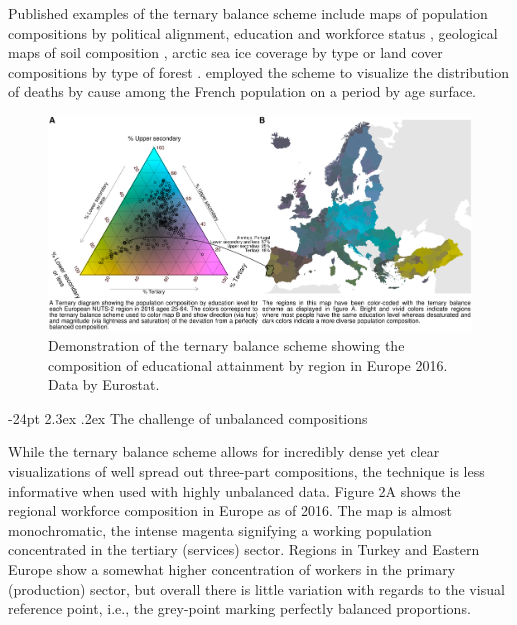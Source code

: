 \documentclass[10pt, twoside, parskip=half]{article}
\makeatletter
\def\maxwidth{\ifdim\Gin@nat@width>\linewidth\linewidth
\else\Gin@nat@width\fi}
\let\Oldincludegraphics\includegraphics
\renewcommand{\includegraphics}[1]{\Oldincludegraphics[width=\maxwidth]{#1}}
\renewcommand\section{\@startsection {section}{1}{\z@}%
                                   {-24pt}%
                                   {2.3ex \@plus.2ex}%
                                   {\normalfont\large\bfseries}}
\makeatother
\begin{document}
Published examples of the ternary balance scheme include maps of
population compositions by political alignment, education and workforce
status \citep{Dorling2012, Graetz2019, Brewer1994}, geological maps of
soil composition \citep{Metternicht2003}, arctic sea ice coverage by
type \citep{Denil2015} or land cover compositions by type of forest
\citep{Pirzamanbein2020, Steidinger2019}. \citet{Schoeley2017} employed
the scheme to visualize the distribution of deaths by cause among the
French population on a period by age surface.

\begin{figure}
\centering
\includegraphics{figure1.png}
\caption{Demonstration of the ternary balance scheme showing the
composition of educational attainment by region in Europe 2016. Data by
Eurostat.}
\end{figure}

\hypertarget{the-challenge-of-unbalanced-compositions}{%
\section{The challenge of unbalanced
compositions}\label{the-challenge-of-unbalanced-compositions}}

While the ternary balance scheme allows for incredibly dense yet clear
visualizations of well spread out three-part compositions, the technique
is less informative when used with highly unbalanced data. Figure 2A
shows the regional workforce composition in Europe as of 2016. The map
is almost monochromatic, the intense magenta signifying a working
population concentrated in the tertiary (services) sector. Regions in
Turkey and Eastern Europe show a somewhat higher concentration of
workers in the primary (production) sector, but overall there is little
variation with regards to the visual reference point, i.e., the
grey-point marking perfectly balanced proportions.
\end{document}
